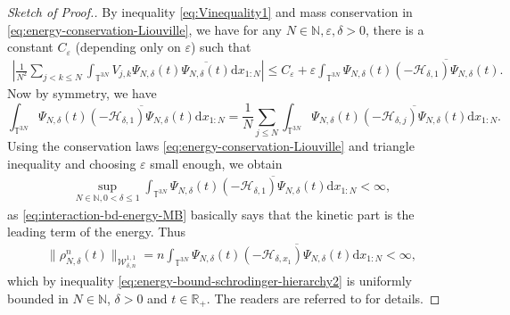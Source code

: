 \begin{proof}[Sketch of Proof.]
  By inequality \eqref{eq:Vinequality1} and mass conservation in
  \eqref{eq:energy-conservation-Liouville}, we have for any $N \in \mathbb{N},
  \varepsilon, \delta > 0$, there is a constant $C_{\varepsilon}$ (depending
  only on $\varepsilon$) such that
  \begin{align}\label{eq:interaction-bd-energy-MB}
    \left| \frac{1}{N^2} \sum_{j < k \leqslant N} \int_{\mathbb{T}^{3N}} V_{j,k} \Psi_{N, \delta} (t) \overline{\Psi_{N,
    \delta} (t)} \mathrm{d} x_{1 : N} \right| \leqslant C_{\varepsilon} +
    \varepsilon \int_{\mathbb{T}^{3N}} \Psi_{N, \delta} (t) \overline{(-
    \mathcal{H}_{\delta, 1}) \Psi_{N, \delta} (t)}.
   \end{align}
  Now by symmetry, we have
  \[ \int_{\mathbb{T}^{3N}} \Psi_{N, \delta} (t) \overline{(-
     \mathcal{H}_{\delta, 1}) \Psi_{N, \delta} (t)} \mathrm{d} x_{1 : N} =
     \frac{1}{N} \sum_{j \leqslant N} \int_{\mathbb{T}^{3N}} \Psi_{N, \delta}
     (t) \overline{(- \mathcal{H}_{\delta, j}) \Psi_{N, \delta} (t)} \mathrm{d}
     x_{1 : N} . \]
  Using the conservation laws \eqref{eq:energy-conservation-Liouville} and
  triangle inequality and choosing $\varepsilon$ small enough, we obtain
  \begin{align}\label{eq:energy-bound-schrodinger-hierarchy2}
    \sup_{N \in \mathbb{N}, 0 < \delta \leqslant 1} \int_{\mathbb{T}^{3N}}
    \Psi_{N, \delta} (t) \overline{(- \mathcal{H}_{\delta, 1}) \Psi_{N,
    \delta} (t)} \mathrm{d} x_{1 : N} < \infty,
  \end{align}
  as \eqref{eq:interaction-bd-energy-MB} basically says that the kinetic part is the leading term of the energy. Thus
  \begin{align}
   \| \rho^n_{N, \delta} (t) \|_{\mathcal{W}^{1, 1}_{\delta, n}} = n \int_{\mathbb{T}^{3N}} \Psi_{N, \delta} (t) \overline{(-
    \mathcal{H}_{\delta, x_1}) \Psi_{N, \delta} (t)} \mathrm{d} x_{1 : N} <
    \infty,
  \end{align}
  which by inequality \eqref{eq:energy-bound-schrodinger-hierarchy2} is
  uniformly bounded in $N \in \mathbb{N}$, $\delta > 0$ and $t \in
  \mathbb{R}_+$. The readers are referred to \cite[Lemma 6.9]{de2025stochastic} for details.
\end{proof}


